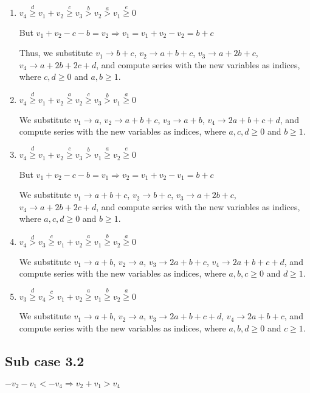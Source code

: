 \documentclass{article}
\begin{document}
\begin{enumerate}
\item 
$v_4\overset{d}{\geq}v_1+v_2\overset{c}{\geq}v_3\overset{b}{>}{v_2}\overset{a}{>}v_1\overset{e}{\geq}{0}$

But $v_1+v_2-c-b=v_2\Rightarrow{v_1=v_1+v_2-v_2=b+c}$

Thus, we substitute 
$v_1\rightarrow{b+c}$, 
$v_2\rightarrow{a+b+c}$, 
$v_3\rightarrow{a+2b+c}$, 
$v_4\rightarrow{a+2b+2c+d}$, and compute series with the new variables as indices, where $c,d\geq{0}$ and $a,b\geq{1}$.
\item 
$v_4\overset{d}{\geq}v_1+v_2\overset{a}{\geq}v_2\overset{c}{\geq}{v_3}\overset{b}{>}v_1\overset{a}{\geq}{0}$

We substitute 
$v_1\rightarrow{a}$, 
$v_2\rightarrow{a+b+c}$, 
$v_3\rightarrow{a+b}$, 
$v_4\rightarrow{2a+b+c+d}$, and compute series with the new variables as indices, where $a,c,d\geq{0}$ and $b\geq{1}$.
\item 
$v_4\overset{d}{\geq}v_1+v_2\overset{c}{\geq}v_3\overset{b}{>}{v_1}\overset{a}{\geq}v_2\overset{e}{\geq}{0}$

But $v_1+v_2-c-b=v_1\Rightarrow{v_2=v_1+v_2-v_1=b+c}$

We substitute 
$v_1\rightarrow{a+b+c}$, 
$v_2\rightarrow{b+c}$, 
$v_3\rightarrow{a+2b+c}$, 
$v_4\rightarrow{a+2b+2c+d}$, and compute series with the new variables as indices, where $a,c,d\geq{0}$ and $b\geq{1}$.
\item 
$v_4\overset{d}{>}v_3\overset{c}{\geq}v_1+v_2\overset{a}{\geq}{v_1}\overset{b}{\geq}v_2\overset{a}{\geq}{0}$

We substitute 
$v_1\rightarrow{a+b}$, 
$v_2\rightarrow{a}$, 
$v_3\rightarrow{2a+b+c}$, 
$v_4\rightarrow{2a+b+c+d}$, and compute series with the new variables as indices, where $a,b,c\geq{0}$ and $d\geq{1}$.
\item 
$v_3\overset{d}{\geq}v_4\overset{c}{>}v_1+v_2\overset{a}{\geq}{v_1}\overset{b}{\geq}v_2\overset{a}{\geq}{0}$

We substitute 
$v_1\rightarrow{a+b}$, 
$v_2\rightarrow{a}$, 
$v_3\rightarrow{2a+b+c+d}$, 
$v_4\rightarrow{2a+b+c}$, and compute series with the new variables as indices, where $a,b,d\geq{0}$ and $c\geq{1}$.
\end{enumerate}

\subsection{Sub case 3.2}
$-v_2-v_1<{-v_4}\Rightarrow{v_2+v_1>{v_4}}$
\end{document}

